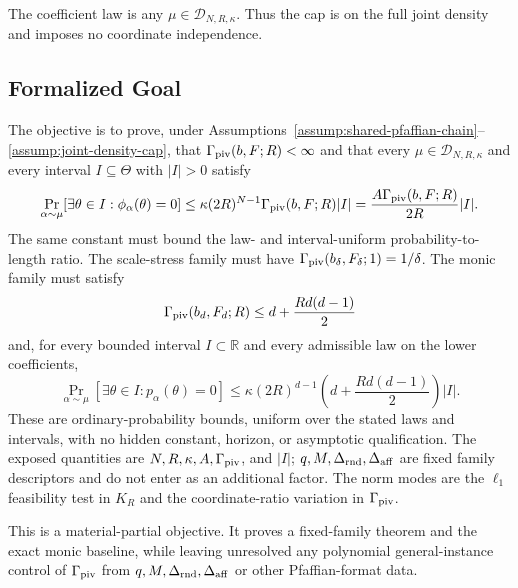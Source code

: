 \begin{assumption}
\label{assump:joint-density-cap}
The coefficient law is any $\mu\in\mathcal D_{N,R,\kappa}$.  Thus the cap
is on the full joint density and imposes no coordinate independence.
\end{assumption}

\subsection{Formalized Goal}

The objective is to prove, under
Assumptions~\ref{assump:shared-pfaffian-chain}--\ref{assump:joint-density-cap},
that $\Gamma_{\rm piv}(b,F;R)<\infty$ and that every
$\mu\in\mathcal D_{N,R,\kappa}$ and every interval $I\subseteq\Theta$ with
$|I|>0$ satisfy
\[
\Pr_{\alpha\sim\mu}\!\left[
  \exists\theta\in I:\phi_\alpha(\theta)=0
\right]
\leq
\kappa(2R)^{N-1}\Gamma_{\rm piv}(b,F;R)|I|
=\frac{A\Gamma_{\rm piv}(b,F;R)}{2R}|I|.
\]
The same constant must bound the law- and interval-uniform
probability-to-length ratio.  The scale-stress family must have
$\Gamma_{\rm piv}(b_\delta,F_\delta;1)=1/\delta$.  The monic family must
satisfy
\[
\Gamma_{\rm piv}(b_d,F_d;R)
\leq d+\frac{Rd(d-1)}2
\]
and, for every bounded interval $I\subset\mathbb R$ and every admissible law
on the lower coefficients,
\[
\Pr_{\alpha\sim\mu}\!\left[
  \exists\theta\in I:p_\alpha(\theta)=0
\right]
\leq
\kappa(2R)^{d-1}
\left(d+\frac{Rd(d-1)}2\right)|I|.
\]
These are ordinary-probability bounds, uniform over the stated laws and
intervals, with no hidden constant, horizon, or asymptotic qualification.
The exposed quantities are $N,R,\kappa,A,\Gamma_{\rm piv}$, and $|I|$;
$q,M,\Delta_{\rm rnd},\Delta_{\rm aff}$ are fixed family descriptors and
do not enter as an additional factor.  The norm modes are the $\ell_1$
feasibility test in $K_R$ and the coordinate-ratio variation in
$\Gamma_{\rm piv}$.

This is a material-partial objective.  It proves a fixed-family theorem and
the exact monic baseline, while leaving unresolved any polynomial
general-instance control of $\Gamma_{\rm piv}$ from
$q,M,\Delta_{\rm rnd},\Delta_{\rm aff}$ or other Pfaffian-format data.
